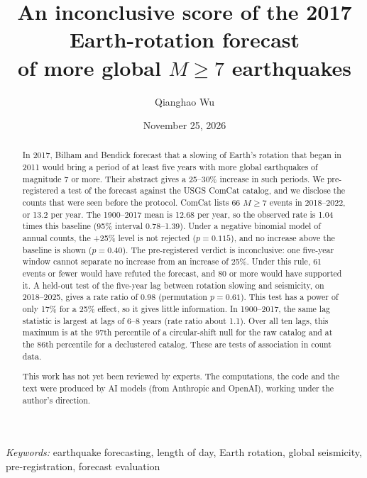 \documentclass[11pt]{article}
\title{An inconclusive score of the 2017 Earth-rotation forecast\\ of more global $M\ge 7$ earthquakes}
\author{Qianghao Wu}
\date{November 25, 2026}
\begin{document}
\maketitle
\begin{abstract}
In 2017, Bilham and Bendick forecast that a slowing of Earth's rotation that began in 2011 would bring a period of at least five years with more global earthquakes of magnitude 7 or more. Their abstract gives a 25--30\% increase in such periods. We pre-registered a test of the forecast against the USGS ComCat catalog, and we disclose the counts that were seen before the protocol. ComCat lists 66 $M\ge7$ events in 2018--2022, or 13.2 per year. The 1900--2017 mean is 12.68 per year, so the observed rate is 1.04 times this baseline (95\% interval 0.78--1.39). Under a negative binomial model of annual counts, the +25\% level is not rejected ($p = 0.115$), and no increase above the baseline is shown ($p = 0.40$). The pre-registered verdict is inconclusive: one five-year window cannot separate no increase from an increase of 25\%. Under this rule, 61 events or fewer would have refuted the forecast, and 80 or more would have supported it. A held-out test of the five-year lag between rotation slowing and seismicity, on 2018--2025, gives a rate ratio of 0.98 (permutation $p = 0.61$). This test has a power of only 17\% for a 25\% effect, so it gives little information. In 1900--2017, the same lag statistic is largest at lags of 6--8 years (rate ratio about 1.1). Over all ten lags, this maximum is at the 97th percentile of a circular-shift null for the raw catalog and at the 86th percentile for a declustered catalog. These are tests of association in count data.

This work has not yet been reviewed by experts. The computations, the code and the text were produced by AI models (from Anthropic and OpenAI), working under the author's direction.
\end{abstract}
\medskip
\noindent\textit{Keywords:} earthquake forecasting, length of day, Earth rotation, global seismicity, pre-registration, forecast evaluation
\end{document}
